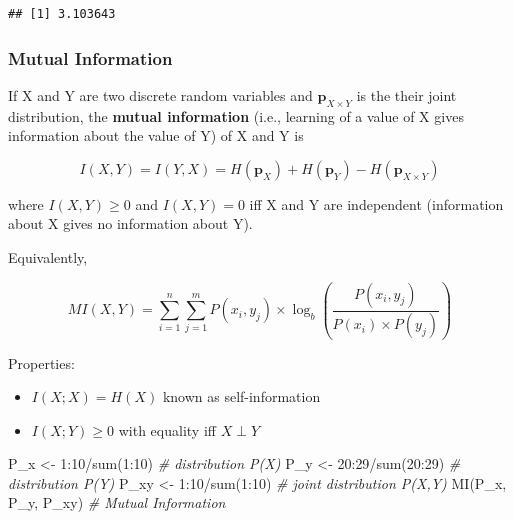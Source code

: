 \documentclass[
]{book}
\newenvironment{Shaded}{\begin{snugshade}}{\end{snugshade}}
\newcommand{\CommentTok}[1]{\textcolor[rgb]{0.56,0.35,0.01}{\textit{#1}}}
\newcommand{\DecValTok}[1]{\textcolor[rgb]{0.00,0.00,0.81}{#1}}
\newcommand{\FunctionTok}[1]{\textcolor[rgb]{0.00,0.00,0.00}{#1}}
\newcommand{\NormalTok}[1]{#1}
\newcommand{\OtherTok}[1]{\textcolor[rgb]{0.56,0.35,0.01}{#1}}
\newcommand{\SpecialCharTok}[1]{\textcolor[rgb]{0.00,0.00,0.00}{#1}}
\providecommand{\tightlist}{%
  \setlength{\itemsep}{0pt}\setlength{\parskip}{0pt}}
\begin{document}
\begin{verbatim}
## [1] 3.103643
\end{verbatim}

\hypertarget{mutual-information}{%
\subsubsection{Mutual Information}\label{mutual-information}}

If X and Y are two discrete random variables and \(\mathbf{p}_{X \times Y}\) is the their joint distribution, the \textbf{mutual
information} (i.e., learning of a value of X gives information about the value of Y) of X and Y is

\[
I(X,Y) = I(Y,X) = H(\mathbf{p}_X)+ H(\mathbf{p}_Y)- H(\mathbf{p}_{X \times Y})
\]

where \(I(X,Y) \ge 0\) and \(I(X,Y) = 0\) iff X and Y are independent (information about X gives no information about Y).

Equivalently,

\[
MI(X,Y) = \sum_{i=1}^n \sum_{j=1}^m P(x_i, y_j) \times \log_b (\frac{P(x_i,y_j)}{P(x_i) \times P(y_j)})
\]

Properties:

\begin{itemize}
\tightlist
\item
  \(I(X;X) = H(X)\) known as self-information
\item
  \(I(X;Y) \ge 0\) with equality iff \(X \perp Y\)
\end{itemize}

\begin{Shaded}
\begin{Highlighting}[]
\NormalTok{P\_x }\OtherTok{\textless{}{-}} \DecValTok{1}\SpecialCharTok{:}\DecValTok{10}\SpecialCharTok{/}\FunctionTok{sum}\NormalTok{(}\DecValTok{1}\SpecialCharTok{:}\DecValTok{10}\NormalTok{) }\CommentTok{\# distribution P(X)}
\NormalTok{P\_y }\OtherTok{\textless{}{-}} \DecValTok{20}\SpecialCharTok{:}\DecValTok{29}\SpecialCharTok{/}\FunctionTok{sum}\NormalTok{(}\DecValTok{20}\SpecialCharTok{:}\DecValTok{29}\NormalTok{) }\CommentTok{\# distribution P(Y)}
\NormalTok{P\_xy }\OtherTok{\textless{}{-}} \DecValTok{1}\SpecialCharTok{:}\DecValTok{10}\SpecialCharTok{/}\FunctionTok{sum}\NormalTok{(}\DecValTok{1}\SpecialCharTok{:}\DecValTok{10}\NormalTok{) }\CommentTok{\# joint distribution P(X,Y)}
\FunctionTok{MI}\NormalTok{(P\_x, P\_y, P\_xy) }\CommentTok{\# Mutual Information}
\end{Highlighting}
\end{Shaded}
\end{document}
